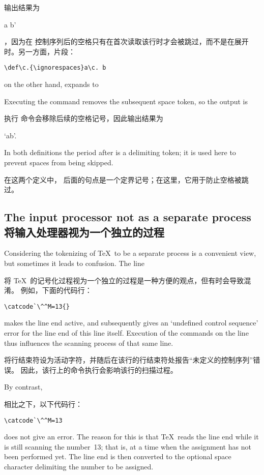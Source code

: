 输出结果为\begin{disp} a b'\end{disp}，因为在  控制序列后的空格只有在首次读取该行时才会被跳过，而不是在展开时。另一方面，片段：
\begin{disp} \verb-\def\c.{\ignorespaces}-\nl \verb-a\c. b-\end{disp}
on the other hand, expands to


\begin{disp}\end{disp}
Executing the  command removes the subsequent
space token, so the output is 

执行  命令会移除后续的空格记号，因此输出结果为
\begin{disp} `ab'.\end{disp}
In both definitions
the period after  is a delimiting token; it is used here
to prevent spaces from being skipped.

在这两个定义中， 后面的句点是一个定界记号；在这里，它用于防止空格被跳过。


\subsection{The input processor not as a separate process\\将输入处理器视为一个独立的过程}

Considering the tokenizing of \TeX\ to be a separate process
is a convenient view, but sometimes it leads to confusion.
The line 

将 \TeX\ 的记号化过程视为一个独立的过程是一种方便的观点，但有时会导致混淆。
例如，下面的代码行：
\begin{verbatim}
\catcode`\^^M=13{}
\end{verbatim}
\awp
makes the line end active,
and subsequently gives an `undefined control sequence' error
for the line end of this line itself. Execution of the commands
on the line thus influences the scanning process of that
same line.

将行结束符设为活动字符，并随后在该行的行结束符处报告“未定义的控制序列”错误。
因此，该行上的命令执行会影响该行的扫描过程。

By contrast, 

相比之下，以下代码行：\begin{verbatim}
\catcode`\^^M=13
\end{verbatim}
does not give an error.
The reason for this is that \TeX\ reads the line end while it is still
scanning the number~13; that is, at a time when the assignment
has not been performed yet.
The line end is then converted to the optional space character
delimiting the number to be assigned.


